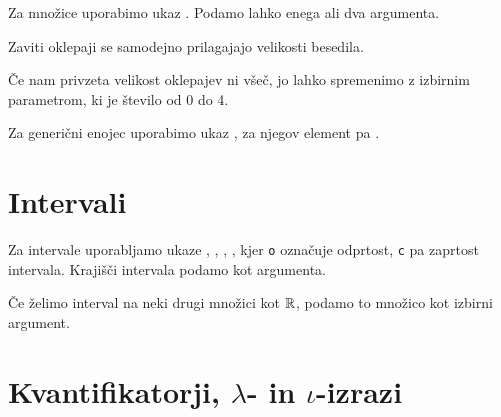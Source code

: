 Za množice uporabimo ukaz . Podamo lahko enega ali dva argumenta.

Zaviti oklepaji se samodejno prilagajajo velikosti besedila.

Če nam privzeta velikost oklepajev ni všeč, jo lahko spremenimo z izbirnim parametrom, ki je število od 0 do 4.

Za generični enojec uporabimo ukaz , za njegov element pa .

\section*{Intervali}


Za intervale uporabljamo ukaze , , , , kjer \texttt{o} označuje odprtost, \texttt{c} pa zaprtost intervala. Krajišči intervala podamo kot argumenta.

Če želimo interval na neki drugi množici kot $\mathbb{R}$, podamo to množico kot izbirni argument.

\section*{Kvantifikatorji, $\lambda$- in $\iota$-izrazi}



